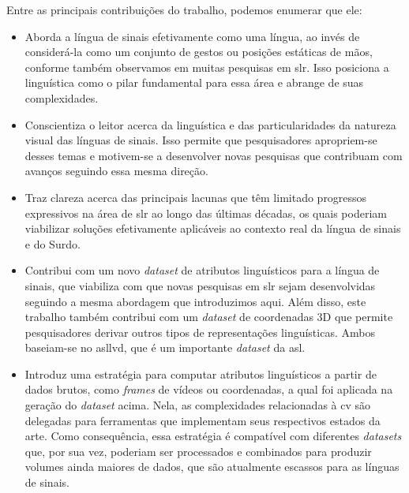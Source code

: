 
Entre as principais contribuições do trabalho, podemos enumerar que ele:

\begin{itemize}
      \item Aborda a língua de sinais efetivamente como uma língua, ao invés de considerá-la como um conjunto de gestos ou posições estáticas de mãos, conforme também observamos em muitas pesquisas em \acrshort{slr}.
            Isso posiciona a linguística como o pilar fundamental para essa área e abrange de suas complexidades.

      \item Conscientiza o leitor acerca da linguística e das particularidades da natureza visual das línguas de sinais.
            Isso permite que pesquisadores apropriem-se desses temas e motivem-se a desenvolver novas pesquisas que contribuam com avanços seguindo essa mesma direção.

      \item Traz clareza acerca das principais lacunas que têm limitado progressos expressivos na área de \acrshort{slr} ao longo das últimas décadas, os quais poderiam viabilizar soluções efetivamente aplicáveis ao contexto real da língua de sinais e do Surdo.

      \item Contribui com um novo \textit{dataset} de atributos linguísticos para a língua de sinais, que viabiliza com que novas pesquisas em \acrshort{slr} sejam desenvolvidas seguindo a mesma abordagem que introduzimos aqui.
            Além disso, este trabalho também contribui com um \textit{dataset} de coordenadas 3D que permite pesquisadores derivar outros tipos de representações linguísticas.
            Ambos baseiam-se no \acrshort{asllvd}, que é um importante \textit{dataset} da \acrshort{asl}.

      \item Introduz uma estratégia para computar atributos linguísticos a partir de dados brutos, como \textit{frames} de vídeos ou coordenadas, a qual foi aplicada na geração do \textit{dataset} acima.
            Nela, as complexidades relacionadas à \acrlong{cv} são delegadas para ferramentas que implementam seus respectivos estados da arte.
            Como consequência, essa estratégia é compatível com diferentes \textit{datasets} que, por sua vez, poderiam ser processados e combinados para produzir volumes ainda maiores de dados, que são atualmente escassos para as línguas de sinais.


\end{itemize}
